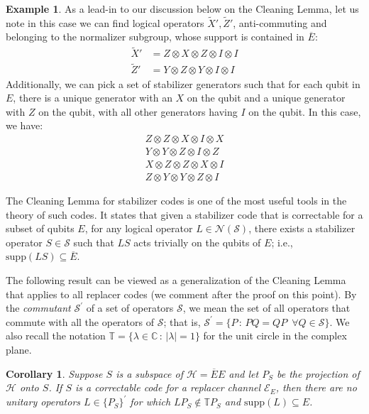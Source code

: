\documentclass[11pt]{amsart}
\newtheorem{cor}[thm]{Corollary}
\theoremstyle{definition}
\newtheorem{example}[thm]{Example}
\theoremstyle{definition}
\theoremstyle{definition}
\newcommand{\1}{\mathbb{I}}
\begin{document}
\begin{example}
As a lead-in to our discussion below on the Cleaning Lemma, let us note in this case we can find logical operators $\widetilde{X}',\widetilde{Z}'$, anti-commuting and belonging to the normalizer subgroup, whose support is contained in $\overline{E}$:
\begin{align*}
    \widetilde{X}' & = Z\otimes X\otimes Z\otimes I\otimes I \\
    \widetilde{Z}' & = Y\otimes Z\otimes Y\otimes I\otimes I
\end{align*}
Additionally, we can pick a set of stabilizer generators such that for each qubit in $E$, there is a unique generator with an $X$ on the qubit and a unique generator with $Z$ on the qubit, with all other generators having $I$ on the qubit. In this case, we have:
\begin{align*}
    Z\otimes Z\otimes X\otimes I\otimes X \\
    Y\otimes Y\otimes Z\otimes I\otimes Z \\
    X\otimes Z\otimes Z\otimes X\otimes I \\
    Z\otimes Y\otimes Y\otimes Z\otimes I
\end{align*}
\end{example}


The Cleaning Lemma \cite{Rai98,BT09,Ash20,Preskill_notes} for stabilizer codes is one of the most useful tools in the theory of such codes. It states that given a stabilizer code that is correctable for a subset of qubits $E$, for any logical operator $L\in \mathcal N(\mathcal{S})$, there exists a stabilizer operator $S\in \mathcal{S}$ such that $LS$ acts trivially on the qubits of $E$; i.e., $\mathrm{supp}(LS)\subseteq \overline{E}$. 

The following result can be viewed as a generalization of the Cleaning Lemma that applies to all replacer codes (we comment after the proof on this point). By the {\it commutant} $\mathcal S^\prime$ of a set of operators $\mathcal S$, we mean the set of all operators that commute with all the operators of $\mathcal S$; that is, $\mathcal S^\prime = \{ P \, : \, PQ = QP \,\,\, \forall Q\in\mathcal S\}$. We also recall the notation $\mathbb{T} = \{\lambda\in\mathbb{C} \, : \, |\lambda|=1\}$  for the unit circle in the complex plane. 

\begin{cor}\label{cleaninglemma}
Suppose $S$ is a subspace of $\mathcal H = \overline{E} E$ and let $P_S$ be the projection of $\mathcal H$ onto $S$. If $S$ is a correctable code for a replacer channel $\mathcal E_E$, then there are no unitary operators $L\in \{ P_S \}^\prime$ for which $L P_S \notin \mathbb{T} P_S$ and $\mathrm{supp}(L)\subseteq E$.
\end{cor}
\end{document}
